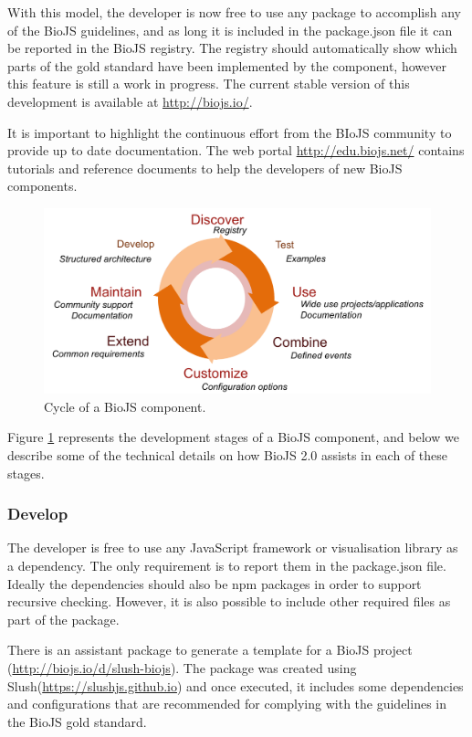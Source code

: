 With this model, the developer is now free to use any package to accomplish any of the BioJS guidelines, and as long it is included in the package.json file it can be reported in the BioJS registry. The registry should automatically show which parts of the gold standard have been implemented by the component, however this feature is still a work in progress. The current stable version of this development is available at \url{http://biojs.io/}.

It is important to highlight the continuous effort from the BIoJS community to provide up to date documentation. The web portal \url{http://edu.biojs.net/} contains tutorials and reference documents to help the developers of new BioJS components.

\begin{figure}  
\centering
\includegraphics[width=\textwidth]{figures/biojs_cycle.png}
\caption[Cycle of a BioJS component]{Cycle of a BioJS component.
\label{fig:biojs_cycle}}
\end{figure}

Figure \ref{fig:biojs_cycle} represents the development stages of  a BioJS component, and below we describe some of the technical details on how BioJS 2.0 assists in each of these stages.

\subsubsection{Develop}
The developer is free to use any JavaScript framework or visualisation library as a dependency. The only requirement is to report them in the package.json file. Ideally the dependencies should also be npm packages in order to support recursive checking. However, it is also possible to include other required files as part of the package. 

There is an assistant package to generate a template for a BioJS project (\url{http://biojs.io/d/slush-biojs}). The package was created using Slush(\url{https://slushjs.github.io}) and once executed, it includes some dependencies and configurations that are recommended for complying with the guidelines in the BioJS gold standard.

